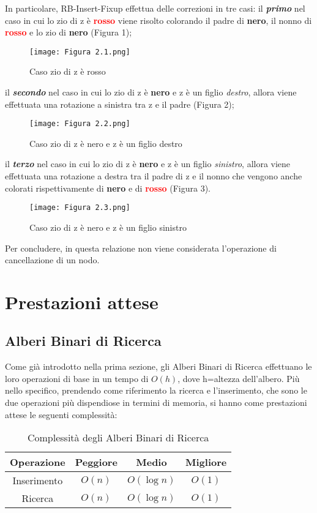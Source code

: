 \documentclass{article}
\begin{document}
In particolare, RB-Insert-Fixup effettua delle correzioni in tre casi: il \textit{\textbf{primo}} nel caso in cui lo zio di z è \textbf{\textcolor{red}{rosso}} viene risolto colorando il padre di \textbf{nero}, il nonno di \textbf{\textcolor{red}{rosso}} e lo zio di \textbf{nero} (Figura 1);
\begin{figure}[!hb]
        \centering
        \texttt{[image: Figura 2.1.png]}
        \caption{Caso zio di z è rosso}
        \label{fig:Figura2.1}
\end{figure}

il \textit{\textbf{secondo}} nel caso in cui lo zio di z è \textbf{nero} e z è un figlio \textit{destro}, allora viene effettuata una rotazione a sinistra tra z e il padre (Figura 2);
\begin{figure}[!hb]
        \centering
        \texttt{[image: Figura 2.2.png]}
        \caption{Caso zio di z è nero e z è un figlio destro}
        \label{fig:Figura2.2}
\end{figure}

il \textit{\textbf{terzo}} nel caso in cui lo zio di z è \textbf{nero} e z è un figlio \textit{sinistro}, allora viene effettuata una rotazione a destra tra il padre di z e il nonno che vengono anche colorati rispettivamente di \textbf{nero} e di \textbf{\textcolor{red}{rosso}} (Figura 3).
\begin{figure}[!hb]
        \centering
        \texttt{[image: Figura 2.3.png]}
        \caption{Caso zio di z è nero e z è un figlio sinistro}
        \label{fig:Figura2.3}
\end{figure}

Per concludere, in questa relazione non viene considerata l'operazione di cancellazione di un nodo.


\section{Prestazioni attese}
\subsection{Alberi Binari di Ricerca}
Come già introdotto nella prima sezione, gli Alberi Binari di Ricerca effettuano le loro operazioni di base in un tempo di $O(h)$, dove h=altezza dell'albero.
Più nello specifico, prendendo come riferimento la ricerca e l'inserimento, che sono le due operazioni più dispendiose in termini di memoria, si hanno come prestazioni attese le seguenti complessità:
\begin{table}[!hb]
    \centering
    \begin{tabular}{cccc}
    Operazione & Peggiore & Medio & Migliore \\
    \hline
    Inserimento & $O(n)$ & $O(\log{}n)$ & $O(1)$ \\
    Ricerca & $O(n)$ & $O(\log{}n)$ & $O(1)$ \\
    \end{tabular}
    \caption{Complessità degli Alberi Binari di Ricerca}
    \label{tab:ComplexityABR}
\end{table}
\end{document}
